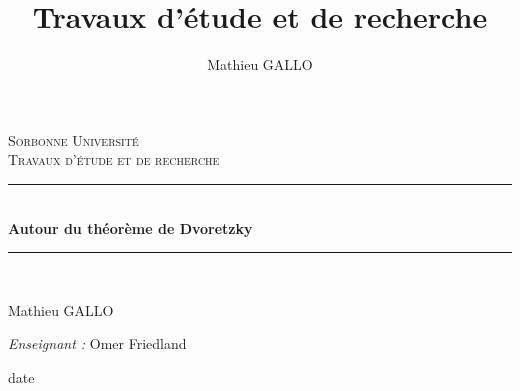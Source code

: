 \documentclass[12pt]{article}
\author{Mathieu GALLO}
\title{Travaux d'étude et de recherche}
\theoremstyle{definition}
\newcommand{\HRule}{\rule{\linewidth}{0.5mm}}
\begin{document}
\begin{titlepage}
	\begin{center}
		
		\textsc{\LARGE Sorbonne Université}\\[2cm]
		
		\textsc{\Large Travaux d'étude et de recherche}\\[1.5cm]
		

		\HRule \\[0.4cm]
		{ \huge \bfseries Autour du théorème de Dvoretzky\\[0.4cm] }
		

		\HRule \\[2cm]

		
		\vfill 
		
		\begin{minipage}{0.4\textwidth}
			\begin{flushleft} 
				Mathieu GALLO \\
			\end{flushleft}
		\end{minipage}
		\begin{minipage}{0.4\textwidth}
			\begin{flushright} 
				\emph{Enseignant :} Omer Friedland\\
			\end{flushright}
		\end{minipage}
		
		\vspace{5mm}		
		{ date}
		
	\end{center}
\end{titlepage}

\tableofcontents\newpage
\end{document}

